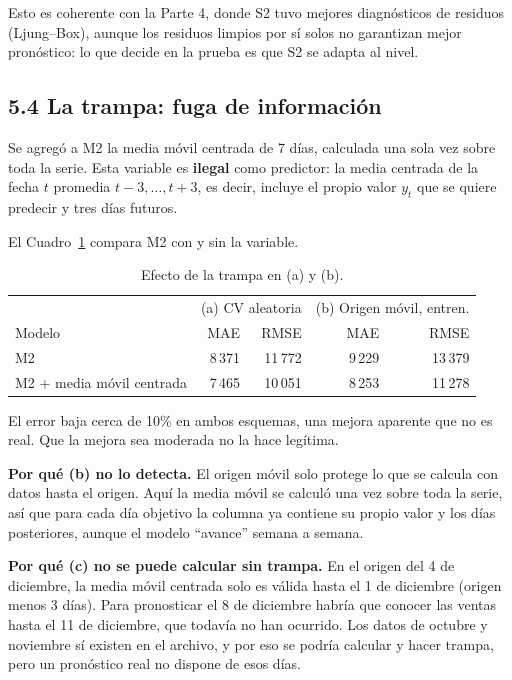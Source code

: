 \documentclass[11pt]{article}
\begin{document}
Esto es coherente con la Parte 4, donde S2 tuvo mejores diagnósticos de residuos (Ljung--Box), aunque los residuos limpios por sí solos no garantizan mejor pronóstico: lo que decide en la prueba es que S2 se adapta al nivel.

\subsection*{5.4 La trampa: fuga de información}
Se agregó a M2 la media móvil centrada de 7 días, calculada una sola vez sobre toda la serie. Esta variable es \textbf{ilegal} como predictor: la media centrada de la fecha $t$ promedia $t-3,\dots,t+3$, es decir, incluye el propio valor $y_t$ que se quiere predecir y tres días futuros.

El Cuadro~\ref{tab:trampa} compara M2 con y sin la variable.

\begin{table}[H]
\centering
\begin{tabular}{l rr rr}
\hline
 & \multicolumn{2}{c}{(a) CV aleatoria} & \multicolumn{2}{c}{(b) Origen móvil, entren.} \\
Modelo & MAE & RMSE & MAE & RMSE \\
\hline
M2 & 8\,371 & 11\,772 & 9\,229 & 13\,379 \\
M2 + media móvil centrada & 7\,465 & 10\,051 & 8\,253 & 11\,278 \\
\hline
\end{tabular}
\caption{Efecto de la trampa en (a) y (b).}
\label{tab:trampa}
\end{table}

El error baja cerca de 10\% en ambos esquemas, una mejora aparente que no es real. Que la mejora sea moderada no la hace legítima.

\textbf{Por qué (b) no lo detecta.} El origen móvil solo protege lo que se calcula con datos hasta el origen. Aquí la media móvil se calculó una vez sobre toda la serie, así que para cada día objetivo la columna ya contiene su propio valor y los días posteriores, aunque el modelo ``avance'' semana a semana.

\textbf{Por qué (c) no se puede calcular sin trampa.} En el origen del 4 de diciembre, la media móvil centrada solo es válida hasta el 1 de diciembre (origen menos 3 días). Para pronosticar el 8 de diciembre habría que conocer las ventas hasta el 11 de diciembre, que todavía no han ocurrido. Los datos de octubre y noviembre sí existen en el archivo, y por eso se podría calcular y hacer trampa, pero un pronóstico real no dispone de esos días.
\end{document}
